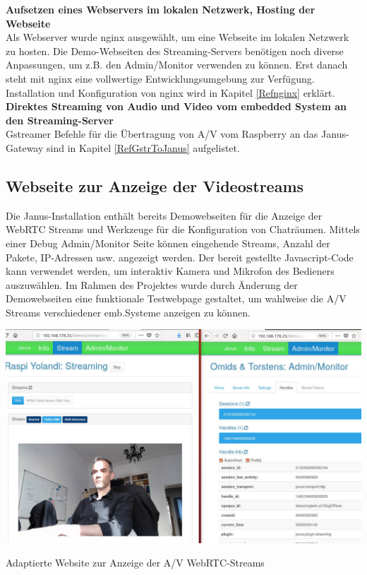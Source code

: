 \textbf{Aufsetzen eines Webservers im lokalen Netzwerk, Hosting der Webseite}\\
Als Webserver wurde nginx ausgewählt, um eine Webseite im lokalen Netzwerk zu hosten. Die Demo-Webseiten des Streaming-Servers benötigen noch diverse Anpassungen, um z.B. den Admin/Monitor verwenden zu können. Erst danach steht mit nginx eine vollwertige Entwicklungsumgebung zur Verfügung. Installation und Konfiguration von nginx wird in Kapitel \ref{Refnginx} erklärt.\\

\textbf{Direktes Streaming von Audio und Video vom embedded System an den Streaming-Server}\\
Gstreamer Befehle für die Übertragung von A/V vom Raspberry an das Janus-Gateway sind in Kapitel \ref{RefGstrToJanus} aufgelistet.

\subsection{Webseite zur Anzeige der Videostreams}
Die Janus-Installation enthält bereits Demowebseiten für die Anzeige der WebRTC Streams und Werkzeuge für die Konfiguration von Chaträumen. Mittels einer Debug Admin/Monitor Seite können eingehende Streams, Anzahl der Pakete, IP-Adressen usw. angezeigt werden. Der bereit gestellte Javascript-Code kann verwendet werden, um interaktiv Kamera und Mikrofon des Bedieners auszuwählen. Im Rahmen des Projektes wurde durch Änderung der Demowebseiten eine funktionale Testwebpage gestaltet, um wahlweise die A/V Streams verschiedener emb.Systeme anzeigen zu können.\\

\begin{minipage}{\textwidth}
    \begin{center}
        \includegraphics[scale=0.27]{img/janusweb.jpg} 
    \end{center}
\end{minipage}
\begin{center}
Adaptierte Website zur Anzeige der A/V WebRTC-Streams
\end{center}

